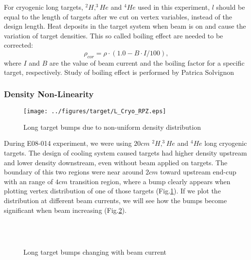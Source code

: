\documentclass[a4paper,18.pt]{article}
\begin{document}
For cryogenic long targets, $^{2}H, ^{3}He$ and $^{4}He$ used in this experiment, $l$ should be equal to the length of targets after we cut on vertex variables, instead of the design length. Heat deposits in the target system when beam is on and cause the variation of target densities. This so called boiling effect are needed to be corrected:
\begin{equation}
  \rho_{cor} = \rho \cdot (1.0 - B \cdot I /100),
\end{equation}
where $I$ and $B$ are the value of beam current and the boiling factor for a specific target, respectively. Study of boiling effect is performed by Patrica Solvignon %

\subsubsection{Density Non-Linearity}

\begin{figure}[ht]
 \begin{center}
  \texttt{[image: ../figures/target/L\_Cryo\_RPZ.eps]}
  \caption[Long target bumps due to non-uniform density distribution]{Long target bumps due to non-uniform density distribution}
  \label{he3_bump}
 \end{center}
\end{figure}

During E08-014 experiment, we were using $20cm$ $^{2}H, ^{3}He$ and $^{4}He$ long cryogenic targets. The design of cooling system caused targets had higher density upstream and lower density downstream, even without beam applied on targets. The boundary of this two regions were near around $2cm$ toward upstream end-cup with an range of $4cm$ transition region, where a bump clearly appears when plotting vertex distribution of one of those targets (Fig.\ref{he3_bump}). If we plot the distribution at different beam currents, we will see how the bumps become significant when beam increasing (Fig.\ref{bump_current}).

\begin{figure}[ht!]
 \begin{center}
\\
\\
 \caption[Long target bumps changing with beam current]{Long target bumps changing with beam current}
 \label{bump_current}
\end{center}
\end{figure}
\end{document}
